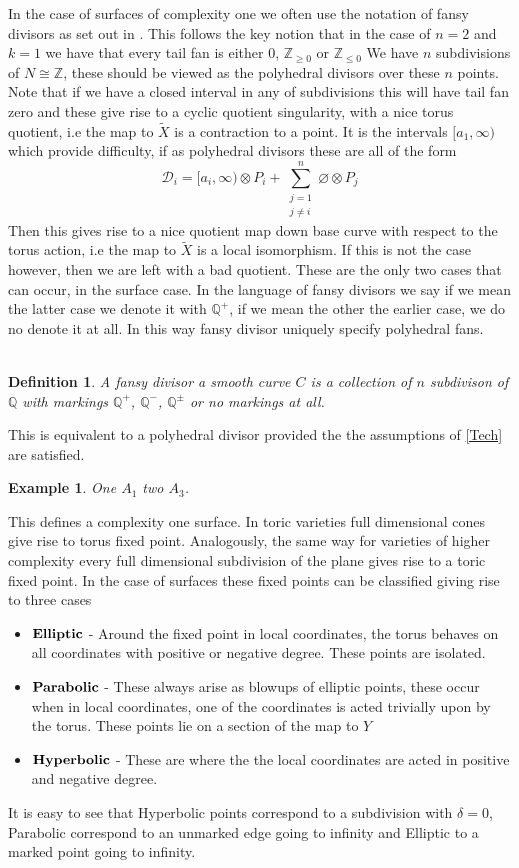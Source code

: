 \documentclass[11pt]{amsart}
\theoremstyle{plain}
\newtheorem{dfn}[thm]{Definition}
\newtheorem{ex}[thm]{Example}
\begin{document}
In the case of surfaces of complexity one we often use the notation of fansy divisors as set out in \cite{Suss}. This follows the key notion that in the case of $n=2$ and $k=1$ we have that every tail fan is either $0$, $\mathbb{Z}_{\geq 0 }$ or $\mathbb{Z}_{\leq 0}$ We have $n$ subdivisions of $N \cong \mathbb{Z}$, these should be viewed as the polyhedral divisors over these $n$ points. Note that if we have a closed interval in any of subdivisions this will have tail fan zero and these give rise to a cyclic quotient singularity, with a nice torus quotient, i.e the map to $\tilde{X}$ is a contraction to a point. It is the intervals $[a_1, \infty )$ which provide difficulty, if as polyhedral divisors these are all of the form 
\[
\mathcal{D}_i = [a_i, \infty) \otimes P_i + \sum_{\substack{j = 1 \\ j \neq i}}^n \varnothing \otimes P_j
\]
Then this gives rise to a nice quotient map down base curve with respect to the torus action, i.e  the map to $\tilde{X}$ is a local isomorphism. If this is not the case however, then we are left with a bad quotient. These are the only two cases that can occur, in the surface case. In the language of fansy divisors we say if we mean the latter case we denote it with $\mathbb{Q}^+$, if we mean the other the earlier case, we do no denote it at all. In this way fansy divisor uniquely specify polyhedral fans.
\\
\\
\begin{dfn}
A fansy divisor a smooth curve $C$ is a collection of $n$ subdivison of $\mathbb{Q}$ with markings $\mathbb{Q}^+$, $\mathbb{Q}^-$, $\mathbb{Q}^\pm$ or no markings at all. 
\end{dfn}
This is equivalent to a polyhedral divisor provided the the assumptions of \ref{Tech} are satisfied.
\begin{ex}
One $A_1$ two $A_3$.
\end{ex}

This defines a complexity one surface. In toric varieties full dimensional cones give rise to torus fixed point. Analogously, the same way for varieties of higher complexity every full dimensional subdivision of the plane gives rise to a toric fixed point. In the case of surfaces these fixed points can be classified giving rise to three cases
\begin{itemize}
\item $\bold{Elliptic}$ - Around the fixed point in local coordinates, the torus behaves on all coordinates with positive or negative degree. These points are isolated.
\item $\bold{Parabolic}$ - These always arise as blowups of elliptic points, these occur when in local coordinates, one of the coordinates is acted trivially upon by the torus. These points lie on a section of the map to $Y$
\item $\bold{Hyperbolic}$ - These are where the the local coordinates are acted in positive and negative degree.
\end{itemize}
It is easy to see that Hyperbolic points correspond to a subdivision with $\delta = 0$, Parabolic correspond to an unmarked edge going to infinity and Elliptic to a marked point going to infinity.
\end{document}
